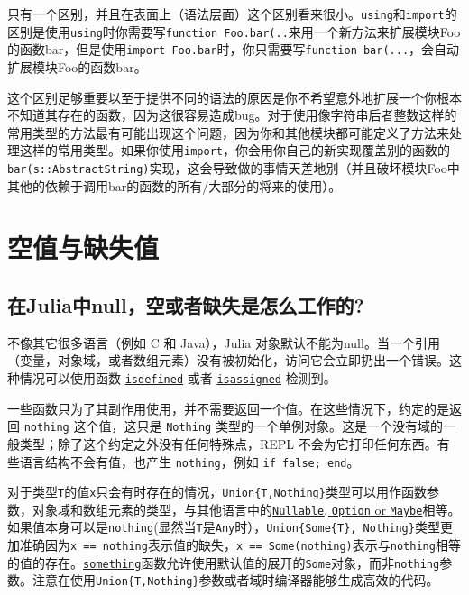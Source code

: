 只有一个区别，并且在表面上（语法层面）这个区别看来很小。\texttt{using}和\texttt{import}的区别是使用\texttt{using}时你需要写\texttt{function Foo.bar(..}来用一个新方法来扩展模块Foo的函数bar，但是使用\texttt{import Foo.bar}时，你只需要写\texttt{function bar(...}，会自动扩展模块Foo的函数bar。



这个区别足够重要以至于提供不同的语法的原因是你不希望意外地扩展一个你根本不知道其存在的函数，因为这很容易造成bug。对于使用像字符串后者整数这样的常用类型的方法最有可能出现这个问题，因为你和其他模块都可能定义了方法来处理这样的常用类型。如果你使用\texttt{import}，你会用你自己的新实现覆盖别的函数的\texttt{bar(s::AbstractString)}实现，这会导致做的事情天差地别（并且破坏模块Foo中其他的依赖于调用bar的函数的所有/大部分的将来的使用）。



\hypertarget{16234869582973036611}{}


\section{空值与缺失值}



\hypertarget{7783935872990633567}{}


\subsection{在Julia中{\textquotedbl}null{\textquotedbl}，{\textquotedbl}空{\textquotedbl}或者{\textquotedbl}缺失{\textquotedbl}是怎么工作的?}



不像其它很多语言（例如 C 和 Java），Julia 对象默认不能为{\textquotedbl}null{\textquotedbl}。当一个引用（变量，对象域，或者数组元素）没有被初始化，访问它会立即扔出一个错误。这种情况可以使用函数 \hyperlink{11212950246505288748}{\texttt{isdefined}} 或者 \hyperlink{976355747478401147}{\texttt{isassigned}} 检测到。



一些函数只为了其副作用使用，并不需要返回一个值。在这些情况下，约定的是返回 \texttt{nothing} 这个值，这只是 \texttt{Nothing} 类型的一个单例对象。这是一个没有域的一般类型；除了这个约定之外没有任何特殊点，REPL 不会为它打印任何东西。有些语言结构不会有值，也产生 \texttt{nothing}，例如 \texttt{if false; end}。



对于类型\texttt{T}的值\texttt{x}只会有时存在的情况，\texttt{Union\{T,Nothing\}}类型可以用作函数参数，对象域和数组元素的类型，与其他语言中的\href{https://en.wikipedia.org/wiki/Nullable\_type}{\texttt{Nullable}, \texttt{Option} or \texttt{Maybe}}相等。如果值本身可以是\texttt{nothing}(显然当\texttt{T}是\texttt{Any}时），\texttt{Union\{Some\{T\}, Nothing\}}类型更加准确因为\texttt{x == nothing}表示值的缺失，\texttt{x == Some(nothing)}表示与\texttt{nothing}相等的值的存在。\hyperlink{12366229165852827603}{\texttt{something}}函数允许使用默认值的展开的\texttt{Some}对象，而非\texttt{nothing}参数。注意在使用\texttt{Union\{T,Nothing\}}参数或者域时编译器能够生成高效的代码。



